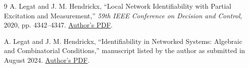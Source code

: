 \documentclass[11pt,a4paper]{article}
\begin{document}
\begin{thebibliography}{9}
A. Legat and J. M. Hendrickx,
``Local Network Identifiability with Partial Excitation and Measurement,''
\emph{59th IEEE Conference on Decision and Control}, 2020, pp. 4342--4347.
\href{https://perso.uclouvain.be/julien.hendrickx/availablepublications/LH2020_CDC.pdf}{Author's PDF}.

A. Legat and J. M. Hendrickx,
``Identifiability in Networked Systems: Algebraic and Combinatorial
Conditions,'' manuscript listed by the author as submitted in August 2024.
\href{https://perso.uclouvain.be/antoine.legat/_static/TAC24.pdf}{Author's PDF}.
\end{thebibliography}
\end{document}
